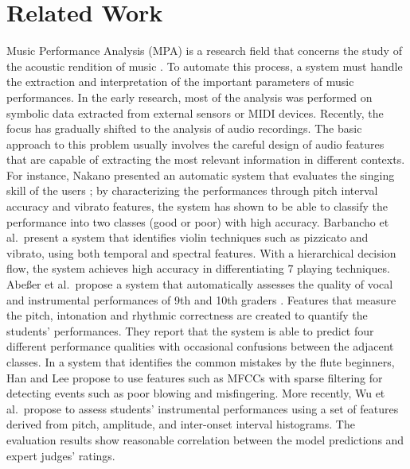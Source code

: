 \documentclass{article}
\begin{document}
\section{Related Work}\label{sec:relatedwork}
Music Performance Analysis (MPA) is a research field that concerns the study of the acoustic rendition of music \cite{lerch_software-based_2009}. To automate this process, a system must handle the extraction and interpretation of the important parameters of music performances. In the early research, most of the analysis was performed on symbolic data extracted from external sensors or MIDI devices. Recently, the focus has gradually shifted to the analysis of audio recordings. The basic approach to this problem usually involves the careful design of audio features that are capable of extracting the most relevant information in different contexts. For instance, Nakano presented an automatic system that evaluates the singing skill of the users \cite{Nakano2006a}; by characterizing the performances through pitch interval accuracy and vibrato features, the system has shown to be able to classify the performance into two classes (good or poor) with high accuracy. 
Barbancho et al.\  present a system that identifies violin techniques such as pizzicato and vibrato, using both temporal and spectral features\cite{Barbancho2009}. With a hierarchical decision flow, the system achieves high accuracy in differentiating 7 playing techniques. 
Abe{\ss}er et al.\ propose a system that automatically assesses the quality of vocal and instrumental performances of 9th and 10th graders \cite{Abeßer2013}. Features that measure the pitch, intonation and rhythmic correctness are created to quantify the students' performances. They report that the system is able to predict four different performance qualities with occasional confusions between the adjacent classes. In a system that identifies the common mistakes by the flute beginners, Han and Lee propose to use features such as MFCCs with sparse filtering for detecting events such as poor blowing and misfingering\cite{Han2014}.%
More recently, Wu et al.\  propose to assess students' instrumental performances using a set of features derived from pitch, amplitude, and inter-onset interval histograms\cite{Wu2016}. The evaluation results show reasonable correlation between the model predictions and expert judges' ratings. 
\end{document}
